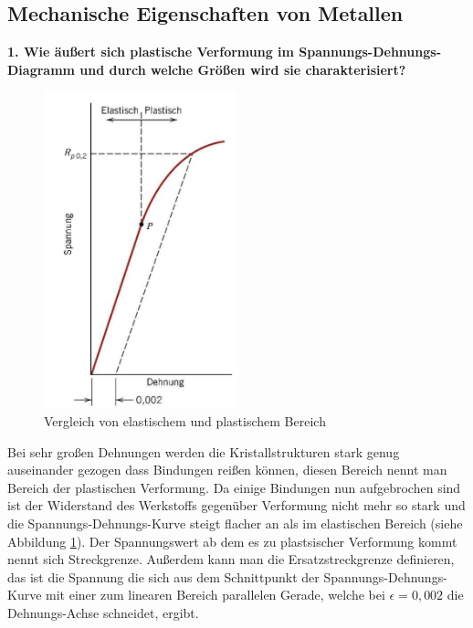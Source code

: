 \subsection{Mechanische Eigenschaften von Metallen}
\noindent\textbf{1. Wie äußert sich plastische Verformung im Spannungs-Dehnungs-Diagramm und durch welche Größen wird sie charakterisiert?}\\
\begin{addmargin}[25pt]{0pt}
\begin{figure}[h]
    \centering
    \includegraphics[width=0.5\textwidth]{images/Materialwissenschaften/plastische_Verformung.jpeg}
    \caption{Vergleich von elastischem und plastischem Bereich }
    \label{fig:plastische_Verformung}
\end{figure}
Bei sehr großen Dehnungen werden die Kristallstrukturen stark genug auseinander gezogen dass Bindungen reißen können, diesen Bereich nennt man Bereich der plastischen Verformung. Da einige Bindungen nun aufgebrochen sind ist der Widerstand des Werkstoffs gegenüber Verformung nicht mehr so stark und die Spannungs-Dehnungs-Kurve steigt flacher an als im elastischen Bereich (siehe Abbildung \ref{fig:plastische_Verformung}). Der Spannungswert ab dem es zu plastsischer Verformung kommt nennt sich Streckgrenze. Außerdem kann man die Ersatzstreckgrenze definieren, das ist die Spannung die sich aus dem Schnittpunkt der Spannungs-Dehnungs-Kurve mit einer zum linearen Bereich parallelen Gerade, welche bei $\epsilon = 0,002$ die Dehnungs-Achse schneidet, ergibt.\\
\end{addmargin}

